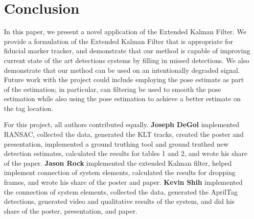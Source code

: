 \documentclass[letterpaper,10pt,conference]{IEEEtran}
\begin{document}
\section{Conclusion}
\label{sec:conclusion}
In this paper, we present a novel application of the Extended Kalman Filter. We provide a formulation of the Extended Kalman Filter that is appropriate for fiducial marker tracker, and demonstrate that our method is capable of improving current state of the art detections systems by filling in missed detections. We also demonstrate that our method can be used on an intentionally degraded signal. Future work with the project could include employing the pose estimate as part of the estimation; in particular, can filtering be used to smooth the pose estimation while also using the pose estimation to achieve a better estimate on the tag location.

For this project, all authors contributed equally.
\textbf{Joseph DeGol} implemented RANSAC, collected the data, generated the KLT tracks, created the poster and presentation, implemented a ground truthing tool and ground truthed new detection estimates, calculated the results for tables 1 and 2, and wrote his share of the paper. \textbf{Jason Rock} implemented the extended Kalman filter, helped implement connection of system elements, calculated the results for dropping frames, and wrote his share of the poster and paper. \textbf{Kevin Shih} implemented the connection of system elements, collected the data, generated the AprilTag detections, generated video and qualitative results of the system, and did his share of the poster, presentation, and paper.




\end{document}
